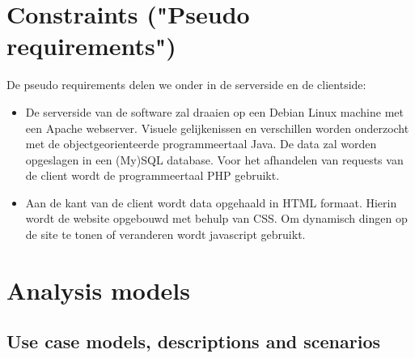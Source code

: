 \documentclass[a4paper,10pt]{article}
\begin{document}
		\clearpage
		\section{Constraints ("Pseudo requirements")}
			De pseudo requirements delen we onder in de serverside en de clientside:
			\begin{itemize}
				\item De serverside van de software zal draaien op een Debian Linux machine met een Apache webserver. Visuele gelijkenissen en verschillen worden onderzocht met de objectgeorienteerde programmeertaal Java. De data zal worden opgeslagen in een (My)SQL database. Voor het afhandelen van requests van de client wordt de programmeertaal PHP gebruikt.
				\item Aan de kant van de client wordt data opgehaald in HTML formaat. Hierin wordt de website opgebouwd met behulp van CSS. Om dynamisch dingen op de site te tonen of veranderen wordt javascript gebruikt.
			\end{itemize}
		
		\clearpage
		\section{Analysis models}
		\subsection{Use case models, descriptions and scenarios}
\end{document}
